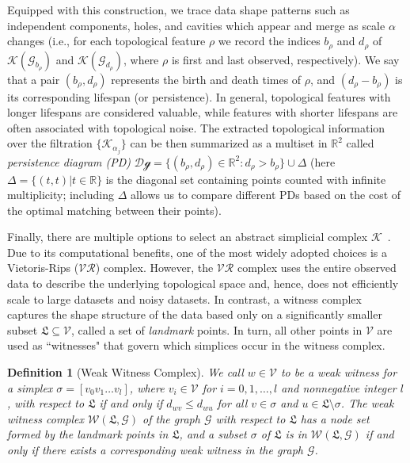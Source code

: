 \documentclass[letterpaper]{article} %
\newtheorem{definition}{Definition} %
\begin{document}
Equipped with this construction, we trace data shape patterns such as independent components, holes, and cavities which appear and merge as scale $\alpha$ changes (i.e., for each topological feature $\rho$ we record the indices $b_{\rho}$ and $d_{\rho}$ of $\mathscr{K}(\mathcal{G}_{b_{\rho}})$ and $\mathscr{K}(\mathcal{G}_{d_{\rho}})$, where $\rho$ is first and last observed, respectively). We say that
a pair $(b_{\rho}, d_{\rho})$ represents the birth and death times of $\rho$, and $(d_{\rho} - b_{\rho})$ is its corresponding lifespan (or persistence). In general, topological features with longer lifespans are considered valuable, while features with shorter lifespans are often associated with topological noise. The extracted topological information over the filtration $\{\mathscr{K}_{\alpha_j}\}$ can be then summarized as a multiset in $\mathbb{R}^2$ called {\it persistence diagram (PD)}
$\mathcal{\text{Dg}}=\{(b_{\rho},d_{\rho}) \in \mathbb{R}^2: d_{\rho} > b_{\rho}\}\cup \Delta$ (here $\Delta= \{(t, t) | t \in \mathbb{R}\}$ is the diagonal set containing points counted with infinite multiplicity; including $\Delta$ allows us to compare different PDs based on the cost of the optimal matching between their points). 

Finally, there are multiple options to select an abstract simplicial complex $\mathscr{K}$~\cite{carlsson2021topological}. Due to its computational benefits, one of the most widely adopted choices is a Vietoris-Rips ($\mathcal{VR}$) complex.
However, the $\mathcal{VR}$ complex uses the entire observed data to describe the underlying topological space and, hence, does not efficiently scale to large datasets and noisy datasets. In contrast, a witness complex captures the shape structure of the data based only on a significantly smaller subset $\mathfrak{L}\subseteq \mathcal{V}$, called a set of {\it landmark} points. In turn, all other points in $\mathcal{V}$ are used as ``witnesses" that govern which simplices occur in the witness complex.
\begin{definition}[\footnotesize{Weak Witness Complex}]
\label{def2}
We call $w\in \mathcal{V}$ to be a {\it weak witness} for a simplex $\sigma=[v_0 v_1 \ldots v_l]$, where $v_i\in \mathcal{V}$ for $i=0,1,\ldots, l$ and nonnegative integer $l$, with respect to $\mathfrak{L}$ if and only if $d_{wv} \leq d_{wu}$ for all $v\in \sigma$ and $u \in  \mathfrak{L} \setminus \sigma$. The {\it weak witness complex} $\mathcal{W}(\mathfrak{L}, \mathcal{G})$ of the graph $\mathcal{G}$ with respect to $\mathfrak{L}$ has a node set formed by the landmark points in $\mathfrak{L}$, and a subset $\sigma$ of $\mathfrak{L}$ is in $\mathcal{W}(\mathfrak{L}, \mathcal{G})$ if and only if there exists a corresponding weak witness in the graph $\mathcal{G}$.
\end{definition}
\end{document}
